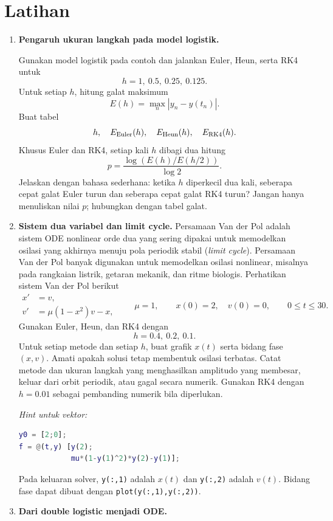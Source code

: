 \documentclass[book,english,noindex,lean,nobackpage,nocopyright,noupdate,nofiglist,notablist]{enacom}
\begin{document}
\section{Latihan}
\begin{enumerate}

\item \textbf{Pengaruh ukuran langkah pada model logistik.}

Gunakan model logistik pada contoh dan jalankan Euler, Heun, serta RK4 untuk
\[
h=1,\ 0.5,\ 0.25,\ 0.125.
\]
Untuk setiap $h$, hitung galat maksimum
\[
E(h)=\max_n |y_n-y(t_n)|.
\]
Buat tabel
\[
h,\quad E_{\rm Euler}(h),\quad E_{\rm Heun}(h),\quad E_{\rm RK4}(h).
\]
Khusus Euler dan RK4, setiap kali $h$ dibagi dua hitung
\[
p=\frac{\log(E(h)/E(h/2))}{\log 2}.
\]
Jelaskan dengan bahasa sederhana: ketika $h$ diperkecil dua kali, seberapa cepat galat Euler turun dan seberapa cepat galat RK4 turun? Jangan hanya menuliskan nilai $p$; hubungkan dengan tabel galat.

\item \textbf{Sistem dua variabel dan limit cycle.}
Persamaan Van der Pol adalah sistem ODE nonlinear orde dua yang sering dipakai untuk memodelkan osilasi yang akhirnya menuju pola periodik stabil (\textit{limit cycle}). Persamaan Van der Pol banyak digunakan untuk memodelkan osilasi nonlinear, misalnya pada rangkaian listrik, getaran mekanik, dan ritme biologis.
Perhatikan sistem Van der Pol berikut
\[
\begin{aligned}
x'&=v,\\
v'&=\mu(1-x^2)v-x,
\end{aligned}
\qquad
\mu=1,
\qquad
x(0)=2,\quad v(0)=0,
\qquad
0\le t\le30.
\]
Gunakan Euler, Heun, dan RK4 dengan
\[
h=0.4,\ 0.2,\ 0.1.
\]
Untuk setiap metode dan setiap $h$, buat grafik $x(t)$ serta bidang fase $(x,v)$. Amati apakah solusi tetap membentuk osilasi terbatas. Catat metode dan ukuran langkah yang menghasilkan amplitudo yang membesar, keluar dari orbit periodik, atau gagal secara numerik. Gunakan RK4 dengan $h=0.01$ sebagai pembanding numerik bila diperlukan.

\textit{Hint untuk vektor:}
\begin{lstlisting}[language=Matlab]
y0 = [2;0];
f = @(t,y) [y(2);
            mu*(1-y(1)^2)*y(2)-y(1)];
\end{lstlisting}
Pada keluaran solver, \texttt{y(:,1)} adalah $x(t)$ dan \texttt{y(:,2)} adalah $v(t)$. Bidang fase dapat dibuat dengan \texttt{plot(y(:,1),y(:,2))}.

\item \textbf{Dari double logistic menjadi ODE.}


\end{enumerate}
\end{document}
